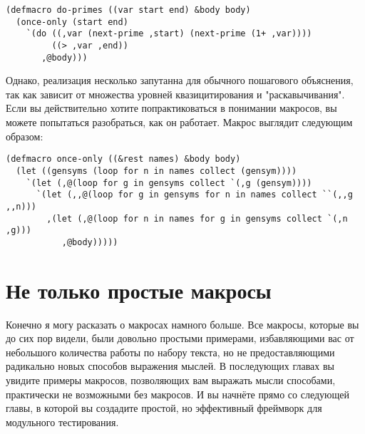 \begin{lstlisting}
(defmacro do-primes ((var start end) &body body)
  (once-only (start end)
    `(do ((,var (next-prime ,start) (next-prime (1+ ,var))))
         ((> ,var ,end))
       ,@body)))
\end{lstlisting}

Однако, реализация  несколько запутанна для обычного пошагового
объяснения, так как зависит от множества уровней квазицитирования и "раскавычивания". Если
вы действительно хотите попрактиковаться в понимании макросов, вы можете попытаться
разобраться, как он работает. Макрос выглядит следующим образом:

\begin{lstlisting}
(defmacro once-only ((&rest names) &body body)
  (let ((gensyms (loop for n in names collect (gensym))))
    `(let (,@(loop for g in gensyms collect `(,g (gensym))))
      `(let (,,@(loop for g in gensyms for n in names collect ``(,,g ,,n)))
        ,(let (,@(loop for n in names for g in gensyms collect `(,n ,g)))
           ,@body)))))
\end{lstlisting}

\section{Не только простые макросы}

Конечно я могу расказать о макросах намного больше. Все макросы, которые вы до сих пор
видели, были довольно простыми примерами, избавляющими вас от небольшого количества работы
по набору текста, но не предоставляющими радикально новых способов выражения мыслей. В
последующих главах вы увидите примеры макросов, позволяющих вам выражать мысли способами,
практически не возможными без макросов. И вы начнёте прямо со следующей главы, в которой
вы создадите простой, но эффективный фреймворк для модульного тестирования.

